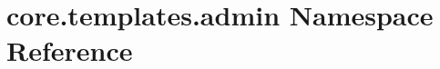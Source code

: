 \hypertarget{namespacecore_1_1templates_1_1admin}{\section{core.\-templates.\-admin Namespace Reference}
\label{namespacecore_1_1templates_1_1admin}
}
